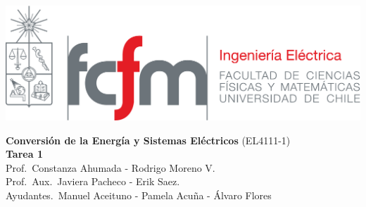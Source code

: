 \documentclass[
  11pt,
  letterpaper,
   addpoints,
   answers
  ]{exam}
\begin{document}
\noindent
\begin{minipage}{0.47\textwidth}
\includegraphics[width=\textwidth]{../fcfm_die}
\end{minipage}
\begin{minipage}{0.53\textwidth}
\begin{center} 
\large\textbf{Conversión de la Energía y Sistemas Eléctricos} (EL4111-1) \\
\large\textbf{Tarea 1} \\
\normalsize Prof.~Constanza Ahumada - Rodrigo Moreno V.\\
\normalsize Prof.~Aux.~Javiera Pacheco - Erik Saez.\\
\normalsize Ayudantes.~Manuel Aceituno - Pamela Acuña - Álvaro Flores 
\end{center}
\end{minipage}
\end{document}
